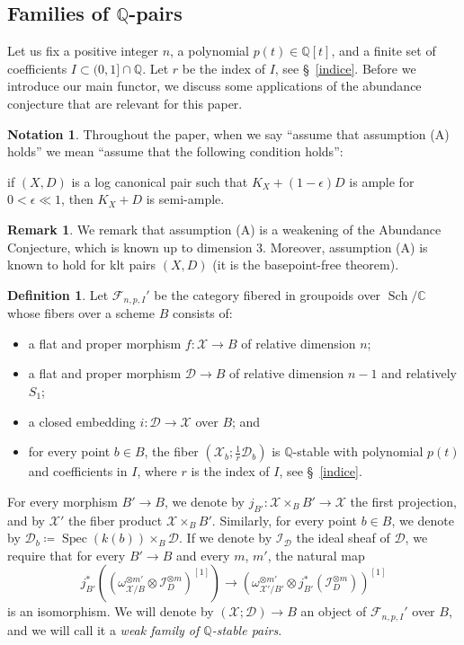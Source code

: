\documentclass{amsart}
\newcommand{\bC}{\mathbb{C}}
\newcommand{\bQ}{\mathbb{Q}}
\newcommand{\sF}{\mathscr{F}}
\newcommand{\cD}{\mathcal{D}}
\newcommand{\cI}{\mathcal{I}}
\newcommand{\cX}{\mathcal{X}}
\newcommand{\spec}{\operatorname{Spec}}
\theoremstyle{definition}
\newtheorem{Def}[theorem]{Definition}
\newtheorem{Notation}[theorem]{Notation}
\newtheorem{Remark}[theorem]{Remark}
\renewcommand{\qq}{\mathbb{Q}}
\begin{document}
\subsection{Families of $\bQ$-pairs}

Let us fix a positive integer $n$, a polynomial $p(t)\in \bQ[t]$, and a finite set of coefficients $I \subset (0,1] \cap \qq$.
Let $r$ be the index of $I$, see \S~\ref{indice}.
Before we introduce our main functor, we discuss some applications of the abundance conjecture that are relevant for this paper.
\begin{Notation}

Throughout the paper, when we say ``assume that assumption (A) holds'' we mean ``assume that the following condition holds'': 
\begin{center}
if $(X,D)$ is a log canonical pair such that $K_X + (1-\epsilon)D$ is ample for $0<\epsilon \ll 1$, then $K_X + D$ is semi-ample.
\end{center}
\end{Notation}
\begin{Remark}
We remark that assumption (A) is a weakening of the Abundance Conjecture, which is known up to dimension 3.
Moreover, assumption (A) is known to hold for klt pairs $(X,D)$ (it is the basepoint-free theorem).

\end{Remark}


\begin{Def}\label{Def:functor}
Let $\sF_{n,p,I}'$ be the category fibered in groupoids over $\operatorname{Sch}/\bC$ whose fibers over a scheme $B$  consists of:
\begin{itemize}
    \item a flat and proper morphism $f \colon \cX\to B$ of relative dimension $n$;
    \item a flat and proper morphism $\cD\to B$ of relative dimension $n-1$ and relatively $S_1$;
    \item a closed embedding $i \colon \cD\to \cX$ over $B$; and
    \item for every point $b\in B$, the fiber $(\cX_b;\frac{1}{r}\cD_b) $ is $\bQ$-stable with polynomial $p(t)$ and coefficients in $I$, where $r$ is the index of $I$, see \S~\ref{indice}.
\end{itemize}
For every morphism $B'\to B$, we denote by  $j_{B'} \colon \cX\times_B B'\to \cX$ the first projection, and by $\cX'$ the fiber product $\cX\times_B B'$.
Similarly, for every point $b\in B$, we denote by $\cD_b \coloneqq \spec(k(b))\times_B\cD$.
If we denote by $\cI_\cD$ the ideal sheaf of $\cD$, we require that for every $B'\to B$ and every $m$, $m'$, the natural map \begin{equation}\label{eq_K_cond}\tag{K}
    j_{B'}^*((\omega_{\cX/B}^{\otimes m'}\otimes\cI_D^{\otimes m})^{[1]})\to (\omega_{\cX'/B'}^{\otimes m'}\otimes j^*_{B'}(\cI_D^{\otimes m}))^{[1]}\end{equation} is an isomorphism.
We will denote by $(\cX;\cD)\to B$ an object of $\sF_{n,p,I}'$ over $B$, and we will call it a \emph{weak family of $\bQ$-stable pairs}.
\end{Def}
\end{document}
